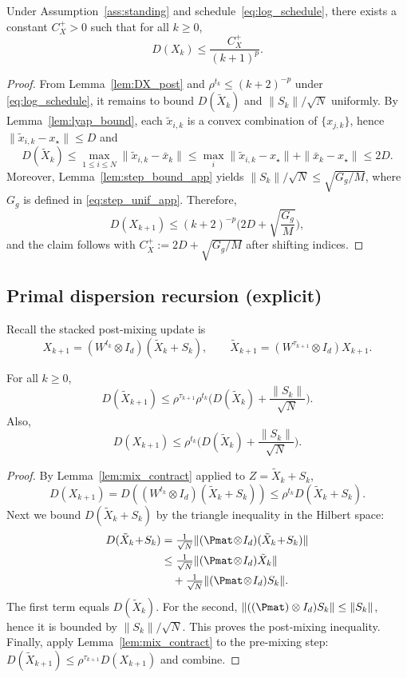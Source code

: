 \documentclass[review,onefignum,onetabnum]{siamart171218}
\begin{document}
\begin{lemma}\label{lem:DX_post_decay}
Under Assumption~\ref{ass:standing} and schedule~\eqref{eq:log_schedule}, there exists a constant $C_X^{+}>0$ such that for all $k\ge 0$,
\[
D(X_k)\le \frac{C_X^{+}}{(k+1)^{p}}.
\]
\end{lemma}
\begin{proof}
From Lemma~\ref{lem:DX_post} and $\rho^{t_k}\le (k+2)^{-p}$ under \eqref{eq:log_schedule}, it remains to bound
$D(\tilde X_k)$ and $\|S_k\|/\sqrt N$ uniformly.
By Lemma~\ref{lem:lyap_bound}, each $\tilde x_{i,k}$ is a convex combination of $\{x_{j,k}\}$, hence $\|\tilde x_{i,k}-x_\star\|\le D$ and
\[
D(\tilde X_k)\le \max_{1\le i\le N}\|\tilde x_{i,k}-\bar x_k\|
\le \max_i \|\tilde x_{i,k}-x_\star\|+\|\bar x_k-x_\star\|\le 2D.
\]
Moreover, Lemma~\ref{lem:step_bound_app} yields $\|S_k\|/\sqrt N\le \sqrt{G_g/M}$, where $G_g$ is defined in \eqref{eq:step_unif_app}.
Therefore,
\[
D(X_{k+1})\le (k+2)^{-p}\Big(2D+\sqrt{\frac{G_g}{M}}\Big),
\]
and the claim follows with $C_X^{+}:=2D+\sqrt{G_g/M}$ after shifting indices.
\end{proof}

\subsection{Primal dispersion recursion (explicit)}

Recall the stacked post-mixing update is
\[
X_{k+1}=(W^{t_k}\otimes I_d)(\tilde X_k+S_k),
\qquad
\tilde X_{k+1}=(W^{\tau_{k+1}}\otimes I_d)X_{k+1}.
\]
\begin{lemma}\label{lem:DX_rec}
For all $k\ge0$,
\[
D(\tilde X_{k+1})
\le \rho^{\tau_{k+1}}\rho^{t_k}\Big(D(\tilde X_k)+\frac{\|S_k\|}{\sqrt N}\Big).
\]
Also,
\[
D(X_{k+1})
\le \rho^{t_k}\Big(D(\tilde X_k)+\frac{\|S_k\|}{\sqrt N}\Big).
\]
\end{lemma}
\begin{proof}
By Lemma~\ref{lem:mix_contract} applied to $Z=\tilde X_k+S_k$,
\[
D(X_{k+1})=D((W^{t_k}\otimes I_d)(\tilde X_k+S_k))\le \rho^{t_k}D(\tilde X_k+S_k).
\]
Next we bound $D(\tilde X_k+S_k)$ by the triangle inequality in the Hilbert space:
\begin{align*}
D(\tilde X_k\!+\!S_k)
&=\tfrac1{\sqrt N}\|(\Pmat\!\otimes\! I_d)(\tilde X_k\!+\!S_k)\|\\
&\le \tfrac1{\sqrt N}\|(\Pmat\!\otimes\! I_d)\tilde X_k\|\\
&\quad+\tfrac1{\sqrt N}\|(\Pmat\!\otimes\! I_d)S_k\|.
\end{align*}
The first term equals $D(\tilde X_k)$.
For the second, $\|((\Pmat)\otimes I_d)S_k\|\le \|S_k\|$, hence it is bounded by $\|S_k\|/\sqrt N$.
This proves the post-mixing inequality.
Finally, apply Lemma~\ref{lem:mix_contract} to the pre-mixing step:
$D(\tilde X_{k+1})\le \rho^{\tau_{k+1}}D(X_{k+1})$ and combine.
\end{proof}
\end{document}
